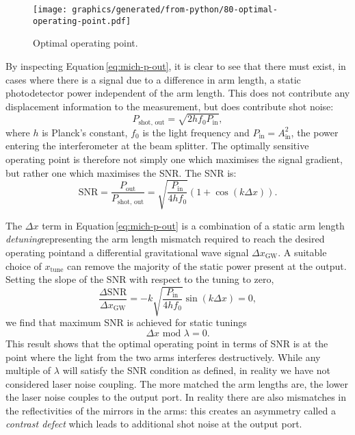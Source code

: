 \begin{figure}
  \centering
  \texttt{[image: graphics/generated/from-python/80-optimal-operating-point.pdf]}
  \caption[Fringe]{\label{fig:optimal-operating-point}Optimal operating point.}
\end{figure}

By inspecting Equation\,\ref{eq:mich-p-out}, it is clear to see that there must exist, in cases where there is a signal due to a difference in arm length, a static photodetector power independent of the arm length. This does not contribute any displacement information to the measurement, but does contribute shot noise:
\begin{equation}
  P_{\text{shot, out}} = \sqrt{2 h f_0 P_{\text{in}}},
\end{equation}
where $h$ is Planck's constant, $f_0$ is the light frequency and $P_{\text{in}} = A_{\text{in}}^2$, the power entering the interferometer at the beam splitter. The optimally sensitive operating point is therefore not simply one which maximises the signal gradient, but rather one which maximises the SNR. The SNR is:
\begin{equation}
  \text{SNR} = \frac{P_{\text{out}}}{P_{\text{shot, out}}} = \sqrt{\frac{P_{\text{in}}}{4 h f_0}} \left( 1 + \cos \left(k \Delta x \right) \right).
\end{equation}

The $\Delta x$ term in Equation\,\ref{eq:mich-p-out} is a combination of a static arm length \emph{detuning}\textemdash representing the arm length mismatch required to reach the desired operating point\textemdash and a differential gravitational wave signal $\Delta x_{\text{GW}}$. A suitable choice of $ x_{\text{tune}}$ can remove the majority of the static power present at the output. Setting the slope of the SNR with respect to the tuning to zero,
\begin{equation}
  \frac{\Delta \text{SNR}}{\Delta x_{\text{GW}}} = -k \sqrt{\frac{P_{\text{in}}}{4 h f_0}} \sin \left(k \Delta x\right) = 0,
\end{equation}
we find that maximum SNR is achieved for static tunings 
\begin{equation}
  \Delta x \text{ mod } \lambda = 0.
\end{equation}
This result shows that the optimal operating point in terms of SNR is at the point where the light from the two arms interferes destructively. While any multiple of $\lambda$ will satisfy the SNR condition as defined, in reality we have not considered laser noise coupling. The more matched the arm lengths are, the lower the laser noise couples to the output port. In reality there are also mismatches in the reflectivities of the mirrors in the arms: this creates an asymmetry called a \emph{contrast defect} which leads to additional shot noise at the output port.

